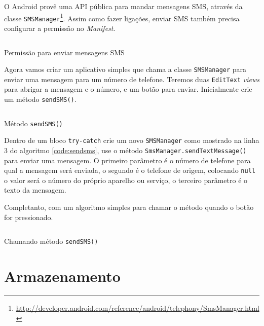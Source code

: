 \documentclass[a4paper,12pt,brazil]{book}
\begin{document}
\begin{singlespace}
		O Android provê uma API pública para mandar mensagens SMS, através da classe \texttt{SMSManager}\footnote{\href{http://developer.android.com/reference/android/telephony/SmsManager.html}{http://developer.android.com/reference/android/telephony/SmsManager.html}}. Assim como fazer ligações, enviar SMS também precisa configurar a permissão no \emph{Manifest}.

		\begin{listing}[H]
		\inputminted[linenos=true,fontsize=\small,frame=lines, framesep=2mm, tabsize=2,numbersep=5pt]{xml}{src/api/comm/sms-perm.xml}
		\caption{Permissão para enviar mensagens SMS}
		\label{code:sms-perm}
		\end{listing} 	

		Agora vamos criar um aplicativo simples que chama a classe \texttt{SMSManager} para enviar uma mensagem para um número de telefone. Teremos duas \texttt{EditText} \emph{views} para abrigar a mensagem e o número, e um botão para enviar. Inicialmente crie um método \texttt{sendSMS()}.

		\begin{listing}[H]
		\inputminted[linenos=true,fontsize=\small,frame=lines, framesep=2mm, tabsize=2,numbersep=5pt]{java}{src/api/comm/sendsms.java}
		\caption{Método \texttt{sendSMS()}}
		\label{code:sendsms}
		\end{listing} 	
	
		Dentro de um bloco \texttt{try-catch} crie um novo \texttt{SMSManager} como mostrado na linha 3 do algoritmo \ref{code:sendsms}, use o método \texttt{SmsManager.sendTextMessage()} para enviar uma mensagem. O primeiro parâmetro é o número de telefone para qual a mensagem será enviada, o segundo é o telefone de origem, colocando \texttt{null} o valor será o número do próprio aparelho ou serviço, o terceiro parâmetro é o texto da mensagem.
		
		Completanto, com um algoritmo simples para chamar o método quando o botão for pressionado.

		\begin{listing}[H]
		\inputminted[linenos=true,fontsize=\small,frame=lines, framesep=2mm, tabsize=2,numbersep=5pt]{java}{src/api/comm/sendsms-oncreate.java}
		\caption{Chamando método \texttt{sendSMS()}}
		\label{code:sendsms}
		\end{listing} 	

\chapter{Armazenamento}


\end{singlespace}
\end{document}
